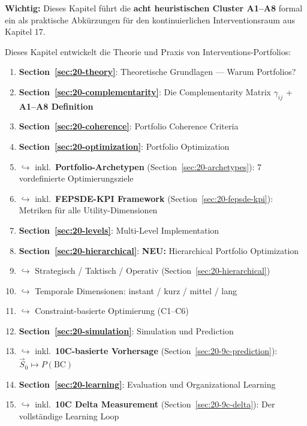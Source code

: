 \begin{tcolorbox}[colback=green!5!white, colframe=green!75!black,
    title=Chapter Overview]

\textbf{Wichtig:} Dieses Kapitel führt die \textbf{acht heuristischen Cluster A1--A8} formal ein als praktische Abkürzungen für den kontinuierlichen Interventionsraum aus Kapitel 17.

Dieses Kapitel entwickelt die Theorie und Praxis von Interventions-Portfolios:

\begin{enumerate}
\item \textbf{Section~\ref{sec:20-theory}}: Theoretische Grundlagen --- Warum Portfolios?
\item \textbf{Section~\ref{sec:20-complementarity}}: Die Complementarity Matrix $\gamma_{ij}$ + \textbf{A1--A8 Definition}
\item \textbf{Section~\ref{sec:20-coherence}}: Portfolio Coherence Criteria
\item \textbf{Section~\ref{sec:20-optimization}}: Portfolio Optimization
\item[] \quad $\hookrightarrow$ inkl.\ \textbf{Portfolio-Archetypen} (Section~\ref{sec:20-archetypes}): 7 vordefinierte Optimierungsziele
\item[] \quad $\hookrightarrow$ inkl.\ \textbf{FEPSDE-KPI Framework} (Section~\ref{sec:20-fepsde-kpi}): Metriken für alle Utility-Dimensionen
\item \textbf{Section~\ref{sec:20-levels}}: Multi-Level Implementation
\item \textbf{Section~\ref{sec:20-hierarchical}}: \textbf{NEU:} Hierarchical Portfolio Optimization
\item[] \quad $\hookrightarrow$ Strategisch / Taktisch / Operativ (Section~\ref{sec:20-hierarchical})
\item[] \quad $\hookrightarrow$ Temporale Dimensionen: instant / kurz / mittel / lang
\item[] \quad $\hookrightarrow$ Constraint-basierte Optimierung (C1--C6)
\item \textbf{Section~\ref{sec:20-simulation}}: Simulation und Prediction
\item[] \quad $\hookrightarrow$ inkl.\ \textbf{10C-basierte Vorhersage} (Section~\ref{sec:20-9c-prediction}): $\vec{S}_0 \mapsto P(\text{BC})$
\item \textbf{Section~\ref{sec:20-learning}}: Evaluation und Organizational Learning
\item[] \quad $\hookrightarrow$ inkl.\ \textbf{10C Delta Measurement} (Section~\ref{sec:20-9c-delta}): Der vollständige Learning Loop

\end{enumerate}
\end{tcolorbox}
